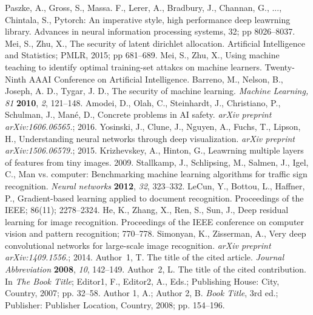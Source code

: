 \documentclass[journal,article,submit,moreauthors,pdftex]{Definitions/mdpi}
\begin{document}
\begin{thebibliography}{999}
Paszke, A., Gross, S., Massa. F., Lerer, A., Bradbury, J., Channan, G., ..., Chintala, S., Pytorch: An imperative style, high performance deep leawrning library. Advances in neural information processing systems, 32; pp 8026--8037.
Mei, S., Zhu, X., The security of latent dirichlet allocation. Artificial Intelligence and Statistics; PMLR, 2015; pp 681--689.
Mei, S., Zhu, X., Using machine teaching to identify optimal training-set attakcs on machine learners. Twenty-Ninth AAAI Conference on Artificial Intelligence.
Barreno, M., Nelson, B., Joseph, A. D., Tygar, J. D.,  The security of machine learning. {\em Machine Learning, 81} {\bf 2010}, {\em 2}, 121--148.
Amodei, D., Olah, C., Steinhardt, J., Christiano, P., Schulman, J., Mané, D., Concrete problems in AI safety. \textit{arXiv preprint arXiv:1606.06565.}; 2016.
Yosinski, J., Clune, J., Nguyen, A., Fuchs, T., Lipson, H., Understanding neural networks through deep visualization. \textit{arXiv preprint arXiv:1506.06579.}; 2015.
Krizhevskey, A., Hinton, G., Leawrning multiple layers of features from tiny images. 2009.
Stallkamp, J., Schlipsing, M., Salmen, J., Igel, C., Man vs. computer: Benchmarking machine learning algorithms for traffic sign recognition. {\em Neural networks} {\bf 2012}, {\em 32}, 323--332.
LeCun, Y., Bottou, L., Haffner, P., Gradient-based learning applied to document recognition. Proceedings of the IEEE; 86(11); 2278--2324.
He, K., Zhang, X., Ren, S., Sun, J., Deep residual learning for image recognition. Proceedings of the IEEE conference on computer vision and pattern recognition; 770--778.
Simonyan, K., Zisserman, A., Very deep convolutional networks for large-scale image recognition. \textit{arXiv preprint arXiv:1409.1556.}; 2014.
Author~1, T. The title of the cited article. {\em Journal Abbreviation} {\bf 2008}, {\em 10}, 142--149.
Author~2, L. The title of the cited contribution. In {\em The Book Title}; Editor1, F., Editor2, A., Eds.; Publishing House: City, Country, 2007; pp. 32--58.
Author 1, A.; Author 2, B. \textit{Book Title}, 3rd ed.; Publisher: Publisher Location, Country, 2008; pp. 154--196.

\end{thebibliography}
\end{document}
